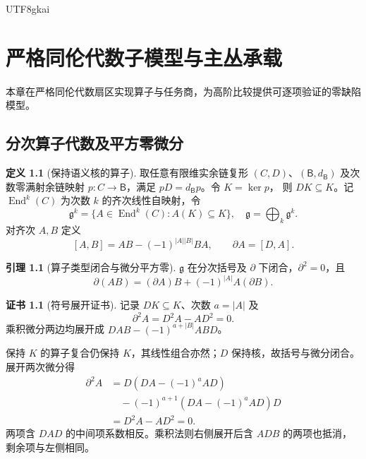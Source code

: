 \documentclass[12pt]{report}
\makeatletter
\theoremstyle{definition}
\newtheorem{definition}{定义}[chapter]
\newtheorem{lemma}{引理}[chapter]
\newtheorem{Certificate}{证书}[chapter]
\renewenvironment{proof}[1][\proofname]{\par
  \pushQED{\qed}\normalfont
  \topsep6\p@\@plus6\p@\relax
  \trivlist
  \item[\hskip\labelsep\normalfont #1\@addpunct{.}]\ignorespaces
}{
  \popQED\endtrivlist\@endpefalse
}
\newcommand{\End}{\operatorname{End}}
\makeatother
\begin{document}
\begin{CJK*}{UTF8}{gkai}
\chapter{严格同伦代数子模型与主丛承载}
\label{sec:pfb}
本章在严格同伦代数扇区实现算子与任务商，为高阶比较提供可逐项验证的零缺陷模型。
\section{分次算子代数及平方零微分}
\begin{definition}[保持语义核的算子]
取任意有限维实余链复形 \((C,D)\)、\((\mathsf B,d_{\mathsf B})\) 及次数零满射余链映射
\(p:C\to\mathsf B\)，满足 \(pD=d_{\mathsf B}p\)。令 \(K=\ker p\)，
则 \(DK\subseteq K\)。记 \(\End^k(C)\) 为次数 \(k\) 的齐次线性自映射，令
\[
\mathfrak g^k=\{A\in\End^k(C): A(K)\subseteq K\},
\quad \mathfrak g=\bigoplus_k\mathfrak g^k.
\]
对齐次 \(A,B\) 定义
\[
[A,B]=AB-(-1)^{|A||B|}BA,\qquad
\partial A=[D,A].
\]
\end{definition}

\begin{lemma}[算子类型闭合与微分平方零]
\label{lem:dg}
\(\mathfrak g\) 在分次括号及 \(\partial\) 下闭合，\(\partial^2=0\)，且
\[
\partial(AB)=(\partial A)B+(-1)^{|A|}A(\partial B).
\]
\end{lemma}
\begin{Certificate}[符号展开证书]
记录 \(DK\subseteq K\)、次数 \(a=|A|\) 及
\[
\partial^2A=D^2A-AD^2=0.
\]
乘积微分两边均展开成 \(DAB-(-1)^{a+|B|}ABD\)。
\end{Certificate}
\begin{proof}
保持 \(K\) 的算子复合仍保持 \(K\)，其线性组合亦然；\(D\) 保持核，故括号与微分闭合。展开两次微分得
\[
\begin{aligned}
\partial^2A
&=D(DA-(-1)^aAD)\\
&\quad-(-1)^{a+1}(DA-(-1)^aAD)D\\
&=D^2A-AD^2=0.
\end{aligned}
\]
两项含 \(DAD\) 的中间项系数相反。乘积法则右侧展开后含 \(ADB\) 的两项也抵消，剩余项与左侧相同。
\end{proof}


\end{CJK*}
\end{document}
